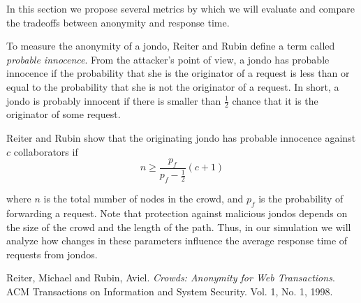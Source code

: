 \documentclass[12pt]{article}
\begin{document}
In this section we propose several metrics by which we will evaluate
and compare the tradeoffs between anonymity and response time.

To measure the anonymity of a jondo, Reiter and Rubin define 
a term called \emph{probable innocence}. From the attacker's point of
view, a jondo has probable innocence if the probability that she is the
originator of a request is less than or equal to the probability that
she is not the originator of a request. In short, a jondo is probably
innocent if there is smaller than $\frac{1}{2}$ chance that it is the
originator of some request.

Reiter and Rubin show that the originating jondo has probable innocence
against $c$ collaborators if
\[
	n \ge \frac{p_f}{p_f - \frac{1}{2}}(c+1)
\]

where $n$ is the total number of nodes in the crowd, and $p_f$ is
the probability of forwarding a request. Note that protection against
malicious jondos depends on the size of the crowd and the length of
the path. Thus, in our simulation we will analyze how changes in these
parameters influence the average response time of requests from jondos.


\begin{thebibliography}{9}

	  Reiter, Michael and Rubin, Aviel.
	  \emph{Crowds: Anonymity for Web Transactions}.
	  ACM Transactions on Information and System Security.
	  Vol. 1, No. 1, 1998.

\end{thebibliography}
\end{document}
